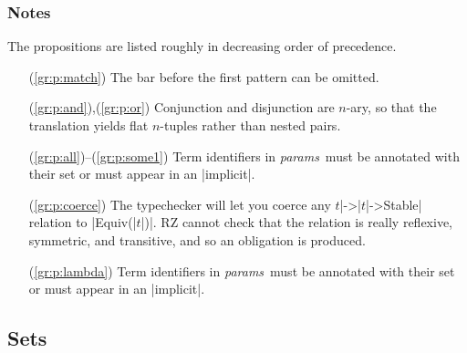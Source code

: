\documentclass[11pt]{article}
\newcommand{\metav}[1]{\mbox{\textit{#1}}}
\newcommand{\Params}{\metav{params}}
\begin{document}
\subsubsection*{Notes}

The propositions are listed roughly in decreasing order of precedence.

\begin{enumerate}
	\item[(\ref{gr:p:match})] The bar before the first pattern can be omitted.
	\item[(\ref{gr:p:and}),(\ref{gr:p:or})] Conjunction and disjunction are $n$-ary, so that the translation yields flat $n$-tuples rather than nested pairs.
	\item[(\ref{gr:p:all})--(\ref{gr:p:some1})] Term identifiers in \Params\ must be annotated with their set or must appear in an |implicit|.
	\item[(\ref{gr:p:coerce})] The typechecker will let you coerce any  $t$|->|$t$|->Stable| relation to |Equiv(|$t$|)|.  RZ cannot check that the relation is really reflexive, symmetric, and transitive, and so an obligation is produced.
	\item[(\ref{gr:p:lambda})] Term identifiers in \Params\ must be annotated with their set or must appear in an |implicit|.
\end{enumerate}

\iffalse
& \mid & $\metav{longrelation}\ [\ \Term\ ]^*$\\
   $\metav{longunaryrelation}\ \Term$\\
   $\Term\ \metav{longbinaryrelation}\ \Term$\\	 
\fi

\subsection{Sets}
\end{document}

